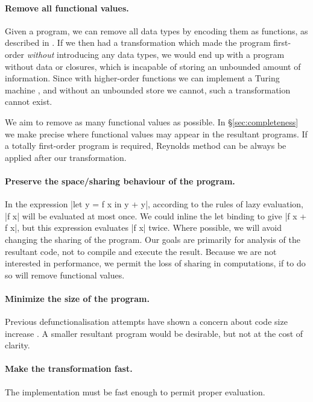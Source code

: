 \documentclass[preprint]{sigplanconf}
\begin{document}
\paragraph{Remove all functional values.} Given a program, we can remove all data types by encoding them as functions, as described in \citet{naylor:reduceron}. If we then had a transformation which made the program first-order \textit{without} introducing any data types, we would end up with a program without data or closures, which is incapable of storing an unbounded amount of information. Since with higher-order functions we can implement a Turing machine \cite{turing:halting}, and without an unbounded store we cannot, such a transformation cannot exist.

We aim to remove as many functional values as possible. In \S\ref{sec:completeness} we make precise where functional values may appear in the resultant programs. If a totally first-order program is required, Reynolds method can be always be applied after our transformation.

\paragraph{Preserve the space/sharing behaviour of the program.} In the expression |let y = f x in y + y|, according to the rules of lazy evaluation, |f x| will be evaluated at most once. We could inline the let binding to give |f x + f x|, but this expression evaluates |f x| twice. Where possible, we will avoid changing the sharing of the program. Our goals are primarily for analysis of the resultant code, not to compile and execute the result. Because we are not interested in performance, we permit the loss of sharing in computations, if to do so will remove functional values.

\paragraph{Minimize the size of the program.} Previous defunctionalisation attempts have shown a concern about code size increase \cite{chin:higher_order_removal}. A smaller resultant program would be desirable, but not at the cost of clarity.

\paragraph{Make the transformation fast.} The implementation must be fast enough to permit proper evaluation.
\end{document}
